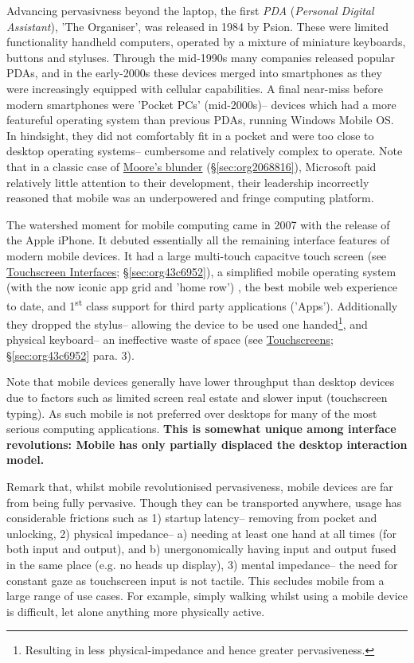 \documentclass[logo,bsc,singlespacing,parskip]{infthesis}
\begin{document}
Advancing pervasivness beyond the laptop, the first \emph{PDA} (\emph{Personal Digital Assistant}), 'The Organiser', was released in 1984 by Psion.
These were limited functionality handheld computers, operated by a mixture of miniature keyboards, buttons and styluses.
Through the mid-1990s many companies released popular PDAs, and in the early-2000s these devices merged into smartphones as they were increasingly equipped with cellular capabilities.
A final near-miss before modern smartphones were 'Pocket PCs' (mid-2000s)-- devices which had a more featureful operating system than previous PDAs, running Windows Mobile OS.
In hindsight, they did not comfortably fit in a pocket and were too close to desktop operating systems-- cumbersome and relatively complex to operate.
Note that in a classic case of \hyperref[sec:org2068816]{Moore's blunder} (\S \ref{sec:org2068816}), Microsoft paid relatively little attention to their development, their leadership incorrectly reasoned that mobile was an underpowered and fringe computing platform.

The watershed moment for mobile computing came in 2007 with the release of the Apple iPhone.
It debuted essentially all the remaining interface features of modern mobile devices.
It had a large multi-touch capacitve touch screen (see \hyperref[sec:org43c6952]{Touchscreen Interfaces}; \S \ref{sec:org43c6952}), a simplified mobile operating system (with the now iconic app grid and 'home row')  , the best mobile web experience to date, and 1\textsuperscript{st} class support for third party applications ('Apps').
Additionally they dropped the stylus-- allowing the device to be used one handed\footnote{Resulting in less physical-impedance and hence greater pervasiveness.}, and physical keyboard-- an ineffective waste of space (see \hyperref[sec:org43c6952]{Touchscreens}; \S \ref{sec:org43c6952} para. 3).

Note that mobile devices generally have lower throughput than desktop devices due to factors such as limited screen real estate and slower input (touchscreen typing).
As such mobile is not preferred over desktops for many of the most serious computing applications.
\textbf{This is somewhat unique among interface revolutions: Mobile has only partially displaced the desktop interaction model.}

Remark that, whilst mobile revolutionised pervasiveness, mobile devices are far from being fully pervasive.
Though they can be transported anywhere, usage has considerable frictions such as 1) startup latency-- removing from pocket and unlocking, 2) physical impedance-- a) needing at least one hand at all times (for both input and output), and b) unergonomically having input and output fused in the same place (e.g. no heads up display), 3) mental impedance-- the need for constant gaze as touchscreen input is not tactile.
This secludes mobile from a large range of use cases.
For example, simply walking whilst using a mobile device is difficult, let alone anything more physically active.
\end{document}
